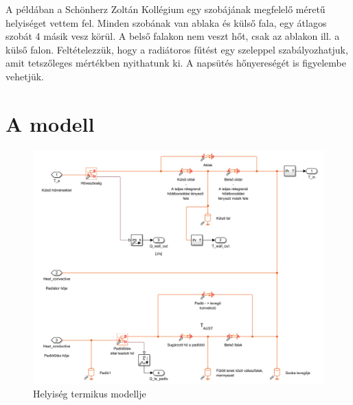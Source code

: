





 A példában a Schönherz Zoltán Kollégium egy szobájának megfelelő méretű helyiséget vettem fel. Minden szobának van ablaka és külső fala, egy átlagos szobát 4 másik vesz körül. A belső falakon nem veszt hőt, csak az ablakon ill. a külső falon. Feltételezzük, hogy a radiátoros fűtést egy szeleppel szabályozhatjuk, amit tetszőleges mértékben nyithatunk ki.
 A napsütés hőnyereségét is figyelembe vehetjük.%

\section{A modell}
\begin{figure}[H]
	\centering
	\includegraphics[trim=0 12 5 0, clip,width=\textwidth]{figures/SimscapeHouse}
	\caption{Helyiség termikus modellje}
	\label{fig:SimscapeHouse}
\end{figure}



